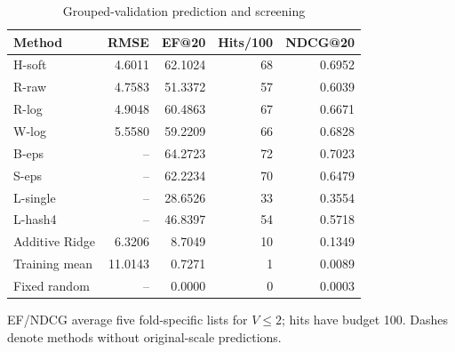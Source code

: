 \par
\begin{table}[H]
\centering
\begin{threeparttable}
\caption{Grouped-validation prediction and screening}\label{tab:mainresults}
\begin{tabular}{@{}lrrrr@{}}
\toprule
Method & RMSE & EF@20 & Hits/100 & NDCG@20\\
\midrule
H-soft & 4.6011 & 62.1024 & 68 & 0.6952\\
R-raw & 4.7583 & 51.3372 & 57 & 0.6039\\
R-log & 4.9048 & 60.4863 & 67 & 0.6671\\
W-log & 5.5580 & 59.2209 & 66 & 0.6828\\
B-eps & -- & 64.2723 & 72 & 0.7023\\
S-eps & -- & 62.2234 & 70 & 0.6479\\
L-single & -- & 28.6526 & 33 & 0.3554\\
L-hash4 & -- & 46.8397 & 54 & 0.5718\\
Additive Ridge & 6.3206 & 8.7049 & 10 & 0.1349\\
Training mean & 11.0143 & 0.7271 & 1 & 0.0089\\
Fixed random & -- & 0.0000 & 0 & 0.0003\\
\bottomrule
\end{tabular}
\begin{tablenotes}[flushleft]
\item[] EF/NDCG average five fold-specific lists for $V\le2$; hits have budget 100. Dashes denote methods without original-scale predictions.
\end{tablenotes}
\end{threeparttable}
\end{table}
\par
